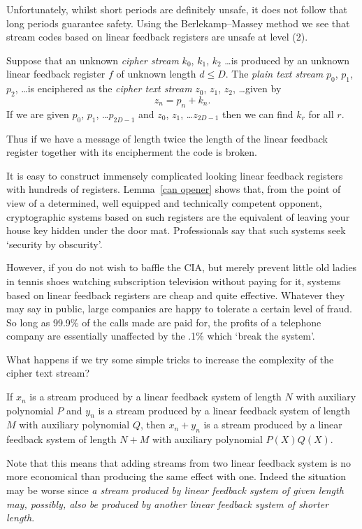 Unfortunately, whilst short periods are definitely
unsafe, it does not follow that long periods
guarantee safety. Using the
Berlekamp--Massey method we see that stream
codes based on linear feedback registers
are unsafe at level (2).
\begin{lemma}\label{can opener}
Suppose that an unknown
\emph{cipher stream} $k_{0}$, $k_{1}$,
$k_{2}$ \dots is produced by an
unknown linear feedback
register $f$ of unknown length $d\leq D$.
The \emph{plain text stream}
$p_{0}$, $p_{1}$, $p_{2}$, \dots is enciphered
as the \emph{cipher text stream}
$z_{0}$, $z_{1}$, $z_{2}$, \dots  given by
\[z_{n}=p_{n}+k_{n}.\]
If we are given $p_{0}$, $p_{1}$, \dots $p_{2D-1}$
and $z_{0}$, $z_{1}$, \dots $z_{2D-1}$
then we can find $k_{r}$ for all $r$.
\end{lemma}
Thus if we have a message of length twice the
length of the linear feedback register
together with its encipherment the code
is broken.

It is easy to construct immensely complicated looking
linear feedback registers with hundreds of registers.
Lemma~\ref{can opener}
shows that, from the point of view of a determined,
well equipped and technically competent
opponent, cryptographic systems based on such registers
are the equivalent of leaving your house key hidden
under the door mat.
Professionals say that such systems seek `security
by obscurity'.

However, if you do not wish
to baffle the CIA, but merely prevent little old
ladies in tennis shoes watching subscription
television without paying for it, systems
based on linear feedback registers are cheap
and quite effective. Whatever they may say in public,
large companies are happy to tolerate a certain level
of fraud. So long as 99.9\% of the calls made are
paid for, the profits of a telephone company are
essentially unaffected by the .1\% which `break the
system'.


What happens if we try some simple tricks
to increase the complexity of the
cipher text stream?
\begin{lemma}\label{clown one}
If $x_{n}$ is a stream
produced by a linear feedback system of length $N$
with auxiliary
polynomial $P$ and $y_{n}$  is a stream
produced by a linear feedback system of length $M$
with auxiliary polynomial $Q$,
then $x_{n}+y_{n}$ is a stream
produced by a linear feedback system of length $N+M$
with auxiliary polynomial $P(X)Q(X)$.
\end{lemma}
\noindent Note that this means that adding streams
from two linear feedback system
is no more  economical than producing
the same effect with one. Indeed the situation
may be worse since \emph{a stream produced by
linear feedback system of given length may, possibly,
also be produced  by another linear feedback system
of shorter length}.

